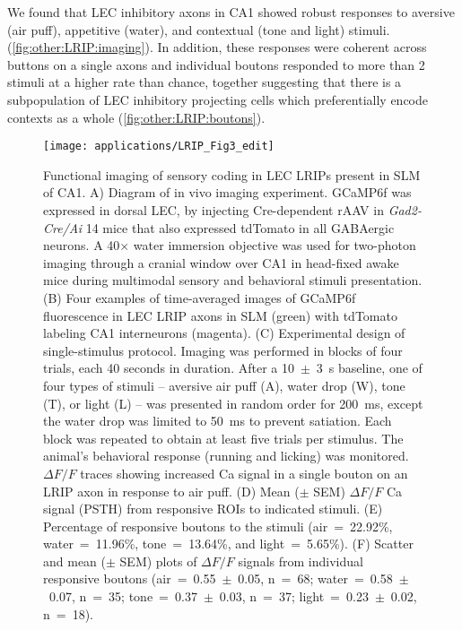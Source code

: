 We found that LEC inhibitory axons in CA1 showed robust responses to aversive (air puff), appetitive (water), and contextual (tone and light) stimuli. (\autoref{fig:other:LRIP:imaging}).
In addition, these responses were coherent across buttons on a single axons and individual boutons responded to more than 2 stimuli at a higher rate than chance, together suggesting that there is a subpopulation of LEC inhibitory projecting cells which preferentially encode contexts as a whole (\autoref{fig:other:LRIP:boutons}).

\begin{figure}
	\centering
	\texttt{[image: applications/LRIP\_Fig3\_edit]}
	\caption[Functional imaging of sensory coding in LEC LRIPs present in SLM of CA1]{Functional imaging of sensory coding in LEC LRIPs present in SLM of CA1.
	A) Diagram of in vivo imaging experiment. GCaMP6f was expressed in dorsal LEC, by injecting Cre-dependent rAAV in \emph{Gad2-Cre/Ai} 14 mice that also expressed tdTomato in all GABAergic neurons. A 40$\times$ water immersion objective was used for two-photon imaging through a cranial window over CA1 in head-fixed awake mice during multimodal sensory and behavioral stimuli presentation.
	(B) Four examples of time-averaged images of GCaMP6f fluorescence in LEC LRIP axons in SLM (green) with tdTomato labeling CA1 interneurons (magenta).
	(C) Experimental design of single-stimulus protocol. Imaging was performed in blocks of four trials, each 40 seconds in duration. After a 10~$\pm$~3~s baseline, one of four types of stimuli -- aversive air puff (A), water drop (W), tone (T), or light (L) -- was presented in random order for 200~ms, except the water drop was limited to 50~ms to prevent satiation. Each block was repeated to obtain at least five trials per stimulus. The animal's behavioral response (running and licking) was monitored. $\Delta F/F$ traces showing increased Ca signal in a single bouton on an LRIP axon in response to air puff.
	(D) Mean ($\pm$ SEM) $\Delta F/F$ Ca signal (PSTH) from responsive ROIs to indicated stimuli.
	(E) Percentage of responsive boutons to the stimuli (air~=~22.92\%, water~=~11.96\%, tone~=~13.64\%, and light~=~5.65\%).
	(F) Scatter and mean ($\pm$ SEM) plots of $\Delta F/F$ signals from individual responsive boutons (air~=~0.55~$\pm$~0.05, n~=~68; water~=~0.58~$\pm$~0.07, n~=~35; tone~=~0.37~$\pm$~0.03, n~=~37; light~=~0.23~$\pm$~0.02, n~=~18).
}
\end{figure}
